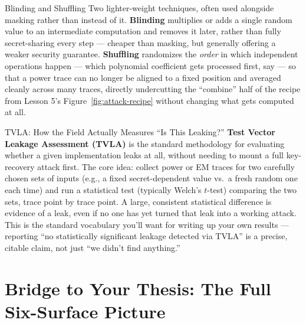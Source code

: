 \begin{rmkbox}{Blinding and Shuffling}
Two lighter-weight techniques, often used alongside masking rather than instead of it. \textbf{Blinding} multiplies or adds a single random value to an intermediate computation and removes it later, rather than fully secret-sharing every step --- cheaper than masking, but generally offering a weaker security guarantee. \textbf{Shuffling} randomizes the \emph{order} in which independent operations happen --- which polynomial coefficient gets processed first, say --- so that a power trace can no longer be aligned to a fixed position and averaged cleanly across many traces, directly undercutting the ``combine'' half of the recipe from Lesson 5's Figure~\ref{fig:attack-recipe} without changing what gets computed at all.
\end{rmkbox}

\begin{factbox}{TVLA: How the Field Actually Measures ``Is This Leaking?''}
\textbf{Test Vector Leakage Assessment (TVLA)} is the standard methodology for evaluating whether a given implementation leaks at all, without needing to mount a full key-recovery attack first. The core idea: collect power or EM traces for two carefully chosen sets of inputs (e.g., a fixed secret-dependent value vs.\ a fresh random one each time) and run a statistical test (typically Welch's $t$-test) comparing the two sets, trace point by trace point. A large, consistent statistical difference is evidence of a leak, even if no one has yet turned that leak into a working attack. This is the standard vocabulary you'll want for writing up your own results --- reporting ``no statistically significant leakage detected via TVLA'' is a precise, citable claim, not just ``we didn't find anything.''
\end{factbox}

\section{Bridge to Your Thesis: The Full Six-Surface Picture}
\label{sec:L6:bridge-to-your-thesis}

